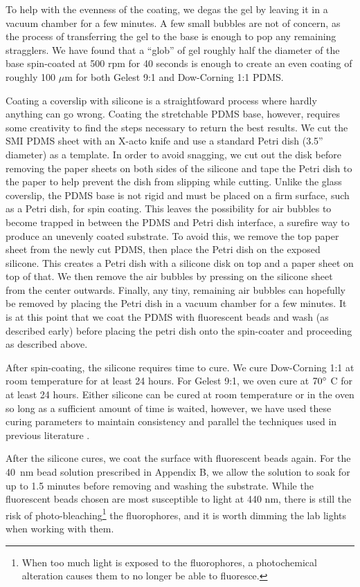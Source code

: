 To help with the evenness of the coating, we degas the gel by leaving it in a vacuum chamber for a few minutes. A few small bubbles are not of concern, as the process of transferring the gel to the base is enough to pop any remaining stragglers. We have found that a ``glob'' of gel roughly half the diameter of the base spin-coated at 500 rpm for 40 seconds is enough to create an even coating of roughly 100 $\mu$m for both Gelest 9:1 and Dow-Corning 1:1 PDMS.

Coating a coverslip with silicone is a straightfoward process where hardly anything can go wrong. Coating the stretchable PDMS base, however, requires some creativity to find the steps necessary to return the best results. We cut the SMI PDMS sheet with an X-acto knife and use a standard Petri dish (3.5'' diameter) as a template. In order to avoid snagging, we cut out the disk before removing the paper sheets on both sides of the silicone and tape the Petri dish to the paper to help prevent the dish from slipping while cutting. Unlike the glass coverslip, the PDMS base is not rigid and must be placed on a firm surface, such as a Petri dish, for spin coating. This leaves the possibility for air bubbles to become trapped in between the PDMS and Petri dish interface, a surefire way to produce an unevenly coated substrate. To avoid this, we remove the top paper sheet from the newly cut PDMS, then place the Petri dish on the exposed silicone. This creates a Petri dish with a silicone disk on top and a paper sheet on top of that. We then remove the air bubbles by pressing on the silicone sheet from the center outwards. Finally, any tiny, remaining air bubbles can hopefully be removed by placing the Petri dish in a vacuum chamber for a few minutes. It is at this point that we coat the PDMS with fluorescent beads and wash (as described early) before placing the petri dish onto the spin-coater and proceeding as described above.

After spin-coating, the silicone requires time to cure. We cure Dow-Corning 1:1  at room temperature for at least 24 hours. For Gelest 9:1, we oven cure at $70 \degree$ C for at least 24 hours. Either silicone can be cured at room temperature or in the oven so long as a sufficient amount of time is waited, however, we have used these curing parameters to maintain consistency and parallel the techniques used in previous literature \cite{xu2017direct}.

After the silicone cures, we coat the surface with fluorescent beads again. For the 40~nm bead solution prescribed in Appendix B, we allow the solution to soak for up to 1.5 minutes before removing and washing the substrate. While the fluorescent beads chosen are most susceptible to light at 440 nm, there is still the risk of photo-bleaching\footnote{When too much light is exposed to the fluorophores, a photochemical alteration causes them to no longer be able to fluoresce.} the fluorophores, and it is worth dimming the lab lights when working with them. 

